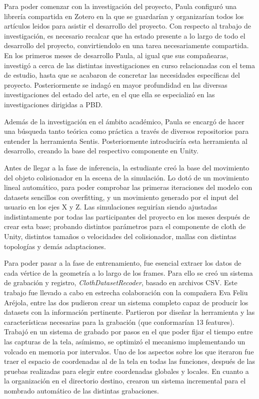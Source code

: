 Para poder comenzar con la investigación del proyecto, Paula configuró una librería compartida en Zotero en la que se guardarían y organizarían todos los artículos leidos para asistir el desarrollo del proyecto. Con respecto al trabajo de investigación, es necesario recalcar que ha estado presente a lo largo de todo el desarrollo del proyecto, convirtiendolo en una tarea necesariamente compartida. En los primeros meses de desarrollo Paula, al igual que sus compañearas, investigó a cerca de las distintas investigaciones en curso relacionadas con el tema de estudio, hasta que se acabaron de concretar las necesidades específicas del proyecto. Posteriormente se indagó en mayor profundidad en las diversas investigaciones del estado del arte, en el que ella se especializó en las investigaciones dirigidas a PBD. \newline

Además de la investigación en el ámbito académico, Paula se encargó de hacer una búsqueda tanto teórica como práctica a través de diversos repositorios para entender la herramienta Sentis. Posteriormente introduciría esta herramienta al desarrollo, creando la base del respectivo componente en Unity. \newline

Antes de llegar a la fase de inferencia, la estudiante creó la base del movimiento del objeto colisionador en la escena de la simulación. Lo dotó de un movimiento lineal automático, para poder comprobar las primeras iteraciones del modelo con datasets sencillos con overfitting, y un movimiento generado por el input del usuario en los ejes X y Z. Las simulaciones seguirían siendo ajustadas indistintamente por todas las participantes del proyecto en los meses después de crear esta base; probando distintos parámetros para el componente de cloth de Unity, distintos tamaños o velocidades del colisionador, mallas con distintas topologías y demás adaptaciones.\newline

Para poder pasar a la fase de entrenamiento, fue esencial extraer los datos de cada vértice de la geometría a lo largo de los frames. Para ello se creó un sistema de grabación y registro, \textit{ClothDatasetRecoder}, basado en archivos CSV. Este trabajo fue llevado a cabo en estrecha colaboración con la compañera Eva Feliu Aréjola, entre las dos pudieron crear un sistema completo capaz de producir los datasets con la información pertinente. Partieron por diseñar la herramienta y las características necesarias para la grabación (que conformarían 13 features). Trabajó en un sistema de grabado por pasos en el que poder fijar el tiempo entre las capturas de la tela, asímismo, se optimizó el mecanismo implementando un volcado en memoria por intervalos. Uno de los aspectos sobre los que iteraron fue traer el espacio de coordenadas al de la tela en todas las funciones, después de las pruebas realizadas para elegir entre coordenadas globales y locales. En cuanto a la organización en el directorio destino, crearon un sistema incremental para el nombrado automático de las distintas grabaciones. \newline

